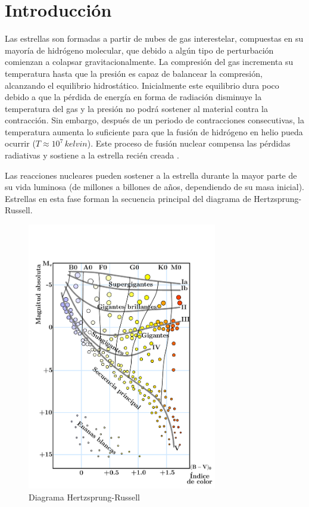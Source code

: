 \chapter{Introducción}

Las estrellas son formadas a partir de nubes de gas interestelar, compuestas en su mayoría de hidrógeno molecular, que debido a algún tipo de perturbación comienzan a colapsar gravitacionalmente. La compresión del gas incrementa su temperatura hasta que la presión es capaz de balancear la compresión, alcanzando el equilibrio hidrostático. Inicialmente este equilibrio dura poco debido a que la pérdida de energía en forma de radiación disminuye la temperatura del gas y la presión no podrá sostener al material contra la contracción. Sin embargo, después de un periodo de contracciones consecutivas, la temperatura aumenta lo suficiente para que la fusión de hidrógeno en helio pueda ocurrir ($T\approx 10^7\,\si{kelvin}$). Este proceso de fusión nuclear compensa las pérdidas radiativas y sostiene a la estrella recién creada \cite{Scilla2016}.

Las reacciones nucleares pueden sostener a la estrella durante la mayor parte de su vida luminosa (de millones a billones de años, dependiendo de su masa inicial). Estrellas en esta fase forman la secuencia principal del diagrama de Hertzsprung-Russell.

\begin{figure}[H]
    \centering
    \includegraphics[width=235pt]{figures/H-R_diagram.pdf}%
    \caption{Diagrama Hertzsprung-Russell}
    \label{HR}
\end{figure}

